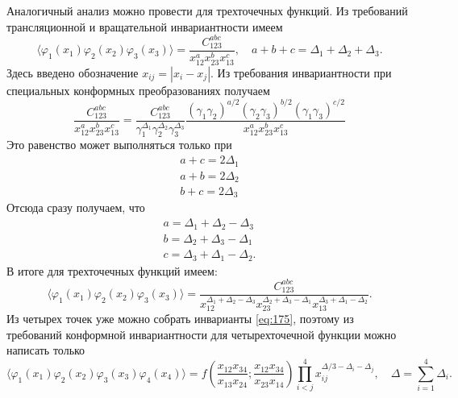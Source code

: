 \documentclass[a4paper,12pt]{article}
\theoremstyle{definition}
\theoremstyle{definition}
\theoremstyle{definition}
\begin{document}
Аналогичный анализ можно провести для трехточечных функций. Из требований трансляционной и вращательной инвариантности имеем
\begin{equation}
  \label{eq:192}
  \langle \varphi_{1}(x_{1})\varphi_{2}(x_{2})\varphi_{3}(x_{3})\rangle=\frac{C^{abc}_{123}}{x_{12}^{a} x_{23}^{b}x_{13}^{c}},\quad a+b+c=\Delta_{1}+\Delta_{2}+\Delta_{3}.
\end{equation}
Здесь введено обозначение $x_{ij}=|x_{i}-x_{j}|$.
Из требования инвариантности при специальных конформных преобразованиях получаем
\begin{equation}
  \label{eq:193}
  \frac{C^{abc}_{123}}{x_{12}^{a} x_{23}^{b}x_{13}^{c}}=\frac{C^{abc}_{123}}{\gamma_{1}^{\Delta_{1}}\gamma_{2}^{\Delta_{2}}\gamma_{3}^{\Delta_{3}}}\frac{(\gamma_{1}\gamma_{2})^{a/2}(\gamma_{2}\gamma_{3})^{b/2}(\gamma_{1}\gamma_{3})^{c/2}}{x_{12}^{a} x_{23}^{b}x_{13}^{c}}
\end{equation}
Это равенство может выполняться только при
\begin{equation}
  \label{eq:194}
  \begin{array}{l}
    a+c=2\Delta_{1}\\
    a+b=2\Delta_{2}\\
    b+c=2\Delta_{3}
  \end{array}
\end{equation}
Отсюда сразу получаем, что
\begin{equation}
  \label{eq:195}
  \begin{array}{l}
    a=\Delta_{1}+\Delta_{2}-\Delta_{3}\\
    b=\Delta_{2}+\Delta_{3}-\Delta_{1}\\
    c=\Delta_{3}+\Delta_{1}-\Delta_{2}.
  \end{array}
\end{equation}
В итоге для трехточечных функций имеем:
\begin{equation}
  \label{eq:196}
   \langle \varphi_{1}(x_{1})\varphi_{2}(x_{2})\varphi_{3}(x_{3})\rangle=\frac{C^{abc}_{123}}{x_{12}^{\Delta_{1}+\Delta_{2}-\Delta_{3}} x_{23}^{\Delta_{2}+\Delta_{3}-\Delta_{1}}x_{13}^{\Delta_{3}+\Delta_{1}-\Delta_{2}}}.
\end{equation}
Из четырех точек уже можно собрать инварианты \eqref{eq:175}, поэтому из требований конформной инвариантности для четырехточечной функции можно написать только
\begin{equation}
  \label{eq:197}
  \langle \varphi_{1}(x_{1})\varphi_{2}(x_{2})\varphi_{3}(x_{3})\varphi_{4}(x_{4})\rangle=f\left(\frac{x_{12}x_{34}}{x_{13}x_{24}}; \frac{x_{12}x_{34}}{x_{23}x_{14}}\right) \prod_{i<j}^{4}x_{ij}^{\Delta/3-\Delta_{i}-\Delta_{j}},\quad \Delta=\sum_{i=1}^{4}\Delta_{i}.
\end{equation}
\end{document}
